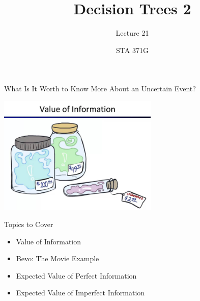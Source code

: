\documentclass{beamer}\usepackage[]{graphicx}\usepackage[]{color}
\title{Decision Trees 2}
\subtitle{Lecture 21}
\author{STA 371G}
\begin{document}
  
  

  \frame{\maketitle}



  \begin{darkframes}
    

    \begin{frame}{What Is It Worth to Know More About an Uncertain Event?}
      \fontsize{10}{10}\selectfont
     \begin{center}
      \includegraphics[width=3in]{ValueOfInformation.png} 
      \end{center}

    \lc %
      
    \end{frame}

    \begin{frame}{Topics to Cover}
      \fontsize{10}{10}\selectfont
        \begin{itemize}[<+->]
            \item Value of Information
            \item Bevo: The Movie Example
            \item Expected Value of Perfect Information
            \item Expected Value of Imperfect Information
        \end{itemize}
      
    \end{frame}



\end{darkframes}
\end{document}
